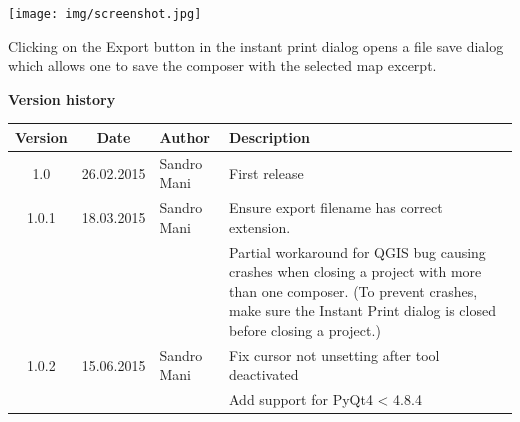 \documentclass[11pt,twoside,a4paper]{report}
\begin{document}
\begin{center}
 \texttt{[image: img/screenshot.jpg]}
\end{center}


Clicking on the Export button in the instant print dialog opens a file save dialog which allows one to save the composer with the selected map excerpt.

\newpage
{\Large{\textbf{Version history}}}
{\small{
\begin{center}
\begin{tabularx}{\textwidth}{|c|c|l|X|}
 \hline
 \textbf{Version} & \textbf{Date} & \textbf{Author} & \textbf{Description} \\\hline
 1.0   & 26.02.2015 & Sandro Mani & First release \\\hline
 1.0.1 & 18.03.2015 & Sandro Mani & Ensure export filename has correct extension. \\
       &            &             & Partial workaround for QGIS bug causing crashes when closing a project with more than one composer. (To prevent crashes, make sure the Instant Print dialog is closed before closing a project.)\\\hline
 1.0.2 & 15.06.2015 & Sandro Mani & Fix cursor not unsetting after tool deactivated \\
       &            &             & Add support for PyQt4 < 4.8.4 \\\hline
 \end{tabularx}
\end{center}
}}
\end{document}
